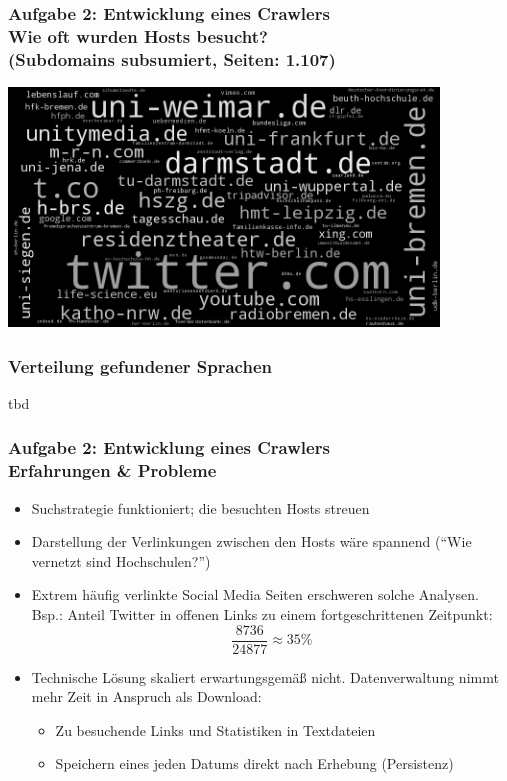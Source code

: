 \documentclass[accentcolor=tud7b,noresetcounter]{tudbeamer}
\begin{document}
  \begin{frame}[t]
  	\frametitle{Aufgabe 2: Entwicklung eines Crawlers\\
  	Wie oft wurden Hosts besucht?\\
  	(Subdomains subsumiert, Seiten: 1.107)}
  	
  	\includegraphics[width=\columnwidth, height=180pt]{../aufg02/wordcloud}	
  \end{frame}

  \begin{frame}
  	\frametitle{Verteilung gefundener Sprachen}
  	tbd
  \end{frame}
  
  \begin{frame}
  	\frametitle{Aufgabe 2: Entwicklung eines Crawlers\\Erfahrungen \& Probleme}
  	\begin{itemize}
		\item Suchstrategie funktioniert; die besuchten Hosts streuen
		\item Darstellung der Verlinkungen zwischen den Hosts wäre spannend ("`Wie vernetzt sind Hochschulen?"')
		\item Extrem häufig verlinkte Social Media Seiten erschweren solche Analysen. Bsp.: Anteil Twitter in offenen Links zu einem fortgeschrittenen Zeitpunkt: 
			$$\frac{8736}{24877}  \approx  35\%$$
  		\item Technische Lösung skaliert erwartungsgemäß nicht. Datenverwaltung nimmt mehr Zeit in Anspruch als Download:
			\begin{itemize}
				\item Zu besuchende Links und Statistiken in Textdateien
				\item Speichern eines jeden Datums direkt nach Erhebung (Persistenz)
			\end{itemize}

  	\end{itemize}

  \end{frame}
  
\end{document}
